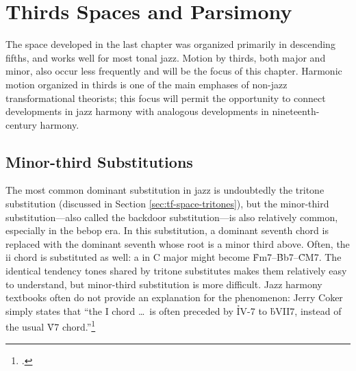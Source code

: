 
\chapter{Thirds Spaces and Parsimony}

The space developed in the last chapter was organized primarily in descending
fifths, and works well for most tonal jazz. Motion by thirds, both major and
minor, also occur less frequently and will be the focus of this chapter.
Harmonic motion organized in thirds is one of the main emphases of non-jazz
transformational theorists; this focus will permit the opportunity to
connect developments in jazz harmony with analogous developments in
nineteenth-century harmony.

\section{Minor-third Substitutions}
\label{sec:minor-third-subst}

The most common dominant substitution in jazz is undoubtedly the tritone
substitution (discussed in Section \ref{sec:tf-space-tritones}), but the
minor-third substitution---also called the backdoor substitution---is also
relatively common, especially in the bebop era. In this substitution, a
dominant seventh chord is replaced with the dominant seventh whose root is a
minor third above. Often, the ii chord is substituted as well: a \tfo in C
major might become \h{Fm7}--\h{Bb7}--\h{CM7}. The identical tendency tones
shared by tritone substitutes makes them relatively easy to understand, but
minor-third substitution is more difficult. Jazz harmony textbooks often do
not provide an explanation for the phenomenon: Jerry Coker simply states that
``the I chord \ldots\ is often preceded by \h{IV-7} to \h{bVII7}, instead of
the usual \h{V7} chord.''\footcite[82]{coker:elements}



